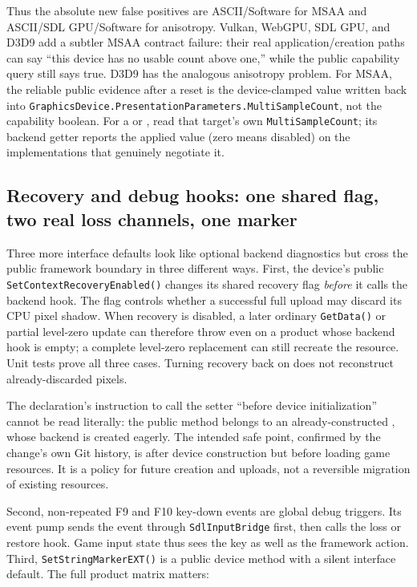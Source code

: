 Thus the absolute new false positives are ASCII/Software for MSAA and
ASCII/SDL GPU/Software for anisotropy. Vulkan, WebGPU, SDL GPU, and D3D9 add a subtler MSAA
contract failure: their real application/creation paths can say ``this device has no usable
count above one,'' while the public capability query still says true. D3D9 has the analogous
anisotropy problem. For MSAA, the reliable public evidence after a reset is the
device-clamped value written back into
\texttt{GraphicsDevice.PresentationParameters.MultiSampleCount}, not the capability boolean.
For a  or , read that target's own
\texttt{MultiSampleCount}; its backend getter reports the applied value (zero means disabled)
on the implementations that genuinely negotiate it.

\subsection{Recovery and debug hooks: one shared flag, two real loss channels, one marker}
\label{sec:backend-recovery-debug-matrix}

Three more interface defaults look like optional backend diagnostics but cross the public
framework boundary in three different ways. First, the device's public
\texttt{SetContextRecovery\allowbreak{}Enabled()} changes its shared recovery flag
\emph{before} it calls the backend hook. The flag
controls whether a successful full  upload may discard its CPU pixel
shadow. When recovery is disabled, a later ordinary \texttt{GetData()} or partial level-zero
update can therefore throw even on a product whose backend hook is empty; a complete
level-zero replacement can still recreate the resource. Unit tests prove all three cases.
Turning recovery back on does not reconstruct already-discarded pixels.

The declaration's instruction to call the setter ``before device initialization'' cannot be
read literally: the public method belongs to an already-constructed
, whose backend is created eagerly. The intended safe point,
confirmed by the change's own Git history, is after device construction but before loading
game resources. It is a policy for future creation and uploads, not a reversible migration
of existing resources.

Second, non-repeated F9 and F10 key-down events are global  debug triggers.
Its event pump sends the event through \texttt{SdlInputBridge} first, then calls the loss or
restore hook. Game input state thus sees the key as well as the framework action. Third,
\texttt{SetStringMarkerEXT()} is a public device method with a silent interface default.
The full product matrix matters:

